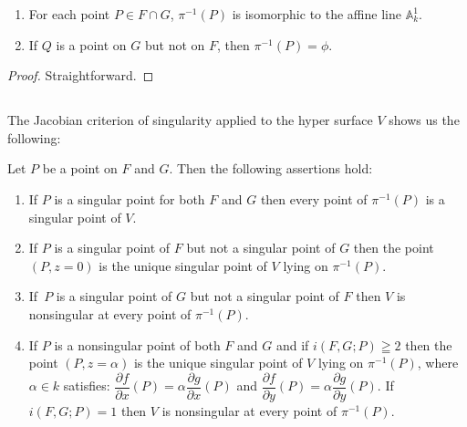 \begin{lemma*}
\begin{enumerate}
\renewcommand{\labelenumi}{\rm(\theenumi)}
\item For each point $P\in F\cap G$, $\pi^{-1}(P)$ is isomorphic to
  the affine line $\mathbb{A}^{1}_{k}$.

\item If $Q$ is a point on $G$ but not on $F$, then
  $\pi^{-1}(P)=\phi$. 
\end{enumerate}
\end{lemma*}

\begin{proof}
Straightforward.
\end{proof}

\subsection{}\label{chap2:5.3}
The Jacobian criterion of singularity applied to the hyper surface $V$
shows us the following:

\begin{lemma*}
Let $P$ be a point on $F$ and $G$. Then the following assertions hold:
\begin{enumerate}
\renewcommand{\labelenumi}{\rm(\theenumi)}
\item If $P$ is a singular point for both $F$ and $G$ then every point
  of $\pi^{-1}(P)$ is a singular point of $V$.

\item If $P$ is a singular point of $F$ but not a singular point of
  $G$ then the point $(P,z=0)$ is the unique singular point of $V$
  lying on $\pi^{-1}(P)$.

\item If\pageoriginale\ $P$ is a singular point of $G$ but not a
  singular point of 
  $F$ then $V$ is nonsingular at every point of $\pi^{-1}(P)$.

\item If $P$ is a nonsingular point of both $F$ and $G$ and if
  $i(F,G;P)\geqq 2$ then the point $(P,z=\alpha)$ is the unique
  singular point of $V$ lying on $\pi^{-1}(P)$, where $\alpha\in k$
  satisfies: $\dfrac{\partial f}{\partial x}(P)=\alpha\dfrac{\partial
    g}{\partial x}(P)$ and $\dfrac{\partial f}{\partial
    y}(P)=\alpha\dfrac{\partial g}{\partial y}(P)$. If $i(F,G;P)=1$
  then $V$ is nonsingular at every point of $\pi^{-1}(P)$.
\end{enumerate}
\end{lemma*}

